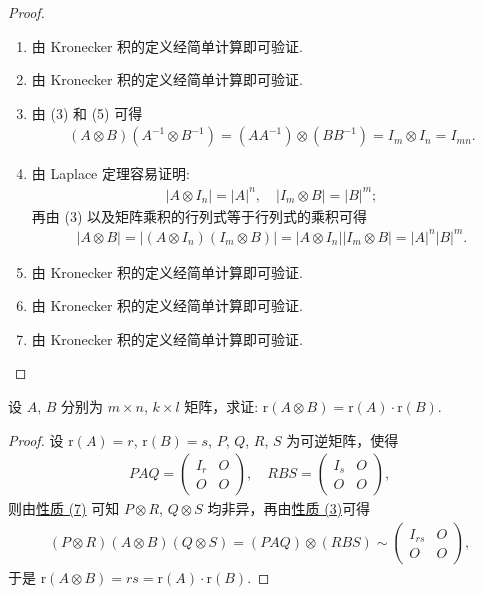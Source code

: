 \documentclass[../../main.tex]{subfiles}
\begin{document}
\begin{proof}
\begin{enumerate}[(1)]
\item 由 Kronecker 积的定义经简单计算即可验证.

\item 由 Kronecker 积的定义经简单计算即可验证.

\item 由 (3) 和 (5) 可得
\begin{align*}
(A\otimes B)(A^{-1}\otimes B^{-1})=(AA^{-1})\otimes (BB^{-1})=I_m\otimes I_n = I_{mn}.
\end{align*}

\item 由 Laplace 定理容易证明:
\begin{align*}
|A\otimes I_n| = |A|^n, \quad |I_m\otimes B| = |B|^m;
\end{align*}
再由 (3) 以及矩阵乘积的行列式等于行列式的乘积可得
\begin{align*}
|A\otimes B| = |(A\otimes I_n)(I_m\otimes B)| = |A\otimes I_n||I_m\otimes B| = |A|^n|B|^m. 
\end{align*}

\item 由 Kronecker 积的定义经简单计算即可验证.

\item 由 Kronecker 积的定义经简单计算即可验证.

\item 由 Kronecker 积的定义经简单计算即可验证.
\end{enumerate}
\end{proof}

\begin{proposition}[矩阵的Kronecker积的秩]\label{proposition:矩阵的Kronecker积的秩}
设 $A$, $B$ 分别为 $m\times n$, $k\times l$ 矩阵，求证: $\mathrm{r}(A\otimes B)=\mathrm{r}(A)\cdot\mathrm{r}(B)$.
\end{proposition}
\begin{proof}
设 $\mathrm{r}(A)=r$, $\mathrm{r}(B)=s$, $P$, $Q$, $R$, $S$ 为可逆矩阵，使得
\begin{align*}
PAQ = \begin{pmatrix}
I_r & O \\
O & O
\end{pmatrix}, \quad RBS = \begin{pmatrix}
I_s & O \\
O & O
\end{pmatrix},
\end{align*}
则由\hyperref[矩阵的Kronecker积的基本性质(7)]{性质 (7)} 可知 $P\otimes R$, $Q\otimes S$ 均非异，再由\hyperref[矩阵的Kronecker积的基本性质(3)]{性质 (3)}可得
\begin{align*}
(P\otimes R)(A\otimes B)(Q\otimes S)=(PAQ)\otimes (RBS)\sim\begin{pmatrix}
I_{rs} & O \\
O & O
\end{pmatrix},
\end{align*}
于是 $\mathrm{r}(A\otimes B)=rs=\mathrm{r}(A)\cdot\mathrm{r}(B)$.  
\end{proof}
\end{document}
